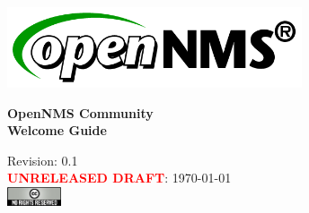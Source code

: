 %
%
%
%

\begin{titlepage}
    \begin{center}
      \textbf{}
      \vspace{3em}
    \end{center}
    \begin{center}
        \includegraphics[width=0.65\textwidth]{images/opennms-logo.png}
    \end{center}
    \vspace{8em}
    \center
    \Huge{\textbf{OpenNMS Community}} \\
    \Huge{\textbf{Welcome Guide}}
    \vspace{11em}
    
    \begin{flushleft}
      \small{Revision: 0.1} \\
      \small{\textbf{\textcolor{red}{UNRELEASED DRAFT}}: \today} \\
      \vspace{2em}
      \includegraphics[width=0.12\textwidth]{images/cc-logo.png}
    \end{flushleft}
\end{titlepage}